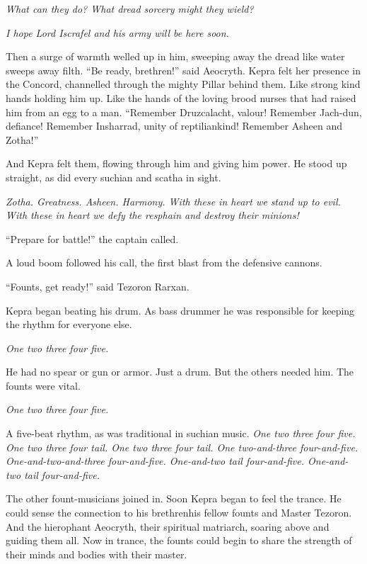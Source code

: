 \documentclass
  [a4paper,
   12pt,
   oneside
  ]%
  {article}
\newcommand{\drum}[1]{\textsl{#1}}
\begin{document}
\emph{What can they do? What dread sorcery might they wield?} 

\emph{I hope Lord Iscrafel and his army will be here soon.}

Then a surge of warmth welled up in him, sweeping away the dread like water sweeps away filth. 
``Be ready, brethren!'' said Aeocryth. 
Kepra felt her presence in the Concord, channelled through the mighty Pillar behind them. 
Like strong kind hands holding him up. 
Like the hands of the loving brood nurses that had raised him from an egg to a man.
``Remember Druzcalacht, valour! Remember Jach-dun, defiance! Remember Insharrad, unity of reptiliankind! Remember Asheen and Zotha!'' 

And Kepra felt them, flowing through him and giving him power. He stood up straight, as did every suchian and scatha in sight. 

\emph{Zotha. Greatness. Asheen. Harmony. With these in heart we stand up to evil. With these in heart we defy the resphain and destroy their minions!}

``Prepare for battle!'' the captain called.

A loud boom followed his call, the first blast from the defensive cannons. 

``Founts, get ready!'' said Tezoron Rarxan. 

Kepra began beating his drum. As bass drummer he was responsible for keeping the rhythm for everyone else.

\drum{One two three four five.} 

He had no spear or gun or armor. Just a drum. 
But the others needed him. The founts were vital. 

\drum{One two three four five.}

A five-beat rhythm, as was traditional in suchian music. 
\drum{%
    One two three four five. One two three four \emph{tail}. One two three four \emph{tail}. One two-and-three four-and-five. One-and-two-and-three four-and-five. One-and-two \emph{tail} four-and-five. One-and-two \emph{tail} four-and-five.}

The other fount-musicians joined in. 
Soon Kepra began to feel the trance. 
He could sense the connection to his brethren\dash{}his fellow founts and Master Tezoron. And the hierophant Aeocryth, their spiritual matriarch, soaring above and guiding them all. 
Now in trance, the founts could begin to share the strength of their minds and bodies with their master.
\end{document}
